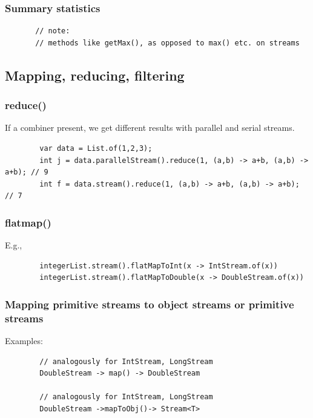 \documentclass{scrartcl}
\begin{document}
\subsubsection{Summary statistics}

    \begin{lstlisting}
       // note:
       // methods like getMax(), as opposed to max() etc. on streams
    \end{lstlisting}

\subsection{Mapping, reducing, filtering}
\subsubsection{reduce()}

    If a combiner present, we get different results with parallel and serial streams.

    \begin{lstlisting}
        var data = List.of(1,2,3);
        int j = data.parallelStream().reduce(1, (a,b) -> a+b, (a,b) -> a+b); // 9
        int f = data.stream().reduce(1, (a,b) -> a+b, (a,b) -> a+b); // 7
    \end{lstlisting}

\subsubsection{flatmap()}

    E.g.,

    \begin{lstlisting}
        integerList.stream().flatMapToInt(x -> IntStream.of(x))
        integerList.stream().flatMapToDouble(x -> DoubleStream.of(x))
    \end{lstlisting}

\subsubsection{Mapping primitive streams to object streams or primitive streams}

    Examples:

    \begin{lstlisting}
        // analogously for IntStream, LongStream
        DoubleStream -> map() -> DoubleStream

        // analogously for IntStream, LongStream
        DoubleStream ->mapToObj()-> Stream<T>

    \end{lstlisting}
\end{document}
